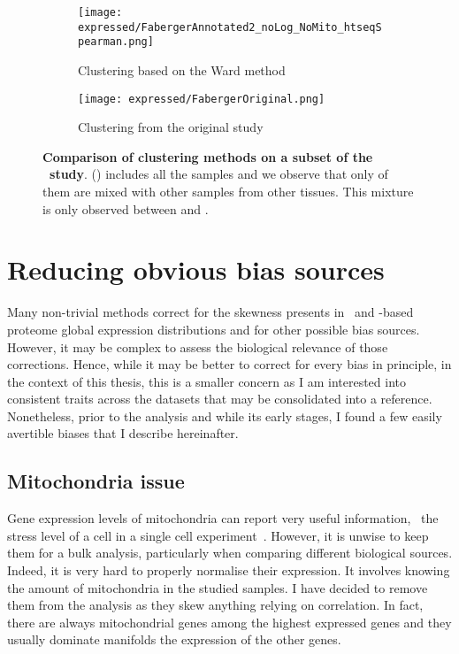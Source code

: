 \begin{figure}[!htb]
    \centering
       \begin{subfigure}[h]{0.70\textwidth}
       \centering \texttt{[image: expressed/FabergerAnnotated2\_noLog\_NoMito\_htseqSpearman.png]}
    \caption{Clustering based on the Ward method}\label{fig:FabergerRedone}
   \end{subfigure}

     \begin{subfigure}[h]{0.70\textwidth}
      \centering \texttt{[image: expressed/FabergerOriginal.png]}
      \caption{Clustering from the original study
      {\footnotesize {}}}\label{fig:fabergerOriginal}
       \end{subfigure}
    \caption[Comparison of clustering methods on a subset of the \uhlen\ study]{%
    \textbf{Comparison of clustering methods on a subset of the \uhlen\ study}.
    () includes all the samples and
    we observe that only of them are mixed with other samples from other tissues.
    This mixture is only observed between   and .
 }\label{fig:versusFaberger}
\end{figure}

\section{Reducing obvious bias sources}\label{sec:bias_sources}

Many non-trivial methods correct for the skewness presents in
\Rnaseq\ and \ms-based proteome global expression distributions
and for other possible bias sources.
However, it may be complex to assess the biological relevance of those corrections.
Hence, while it may be better to correct for every bias in principle,
in the context of this thesis, this is a smaller concern as I am interested into
consistent traits across the datasets that may be consolidated into a reference.
Nonetheless, prior to the analysis and while its early stages,
I found a few easily avertible biases that I describe hereinafter.

\subsection{Mitochondria issue}\label{subsec:mito}

Gene expression levels of mitochondria can report very useful information,
\eg\ the stress level of a cell in a single cell experiment~.
However, it is unwise to keep them for a bulk analysis, particularly when
comparing different biological sources.
Indeed, it is very hard to properly normalise their expression.
It involves knowing the amount of mitochondria in the studied samples.
I have decided to remove them from the analysis as they skew anything relying
on correlation.
In fact, there are always mitochondrial genes among the highest expressed genes
and they usually dominate manifolds the expression of the other genes.

